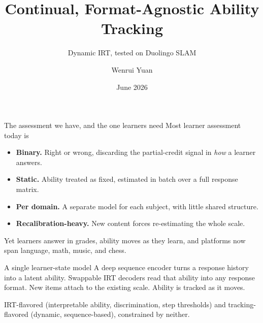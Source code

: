 \documentclass[aspectratio=169]{beamer}
\title[Continual ability tracking]{Continual, Format-Agnostic Ability Tracking}
\subtitle{Dynamic IRT, tested on Duolingo SLAM}
\author{Wenrui Yuan}
\date{June 2026}
\begin{document}
\begin{frame}
  \titlepage
\end{frame}

\begin{frame}{The assessment we have, and the one learners need}
  Most learner assessment today is
  \begin{itemize}
    \item \textbf{Binary.} Right or wrong, discarding the partial-credit signal in \emph{how} a learner answers.
    \item \textbf{Static.} Ability treated as fixed, estimated in batch over a full response matrix.
    \item \textbf{Per domain.} A separate model for each subject, with little shared structure.
    \item \textbf{Recalibration-heavy.} New content forces re-estimating the whole scale.
  \end{itemize}
  \vspace{0.6em}
  Yet learners answer in grades, ability moves as they learn, and platforms now span language, math, music, and chess.
\end{frame}

\begin{frame}{A single learner-state model}
  A deep sequence encoder turns a response history into a latent ability. Swappable IRT decoders read that ability into any response format. New items attach to the existing scale. Ability is tracked as it moves.
  \vspace{0.3em}
  \begin{center}
  \end{center}
  \vspace{0.1em}
  {\small IRT-flavored (interpretable ability, discrimination, step thresholds) and tracking-flavored (dynamic, sequence-based), constrained by neither.}
\end{frame}
\end{document}
